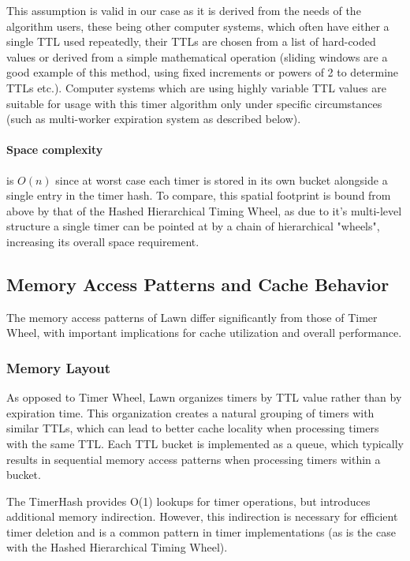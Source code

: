 \documentclass[conference]{IEEEtran}
\begin{document}
This assumption is valid in our case as it is derived from the needs of the algorithm users, these being other computer systems, which often have either a single TTL used repeatedly, their TTLs are chosen from a list of hard-coded values or derived from a simple mathematical operation (sliding windows are a good example of this method, using fixed increments or powers of 2 to determine TTLs etc.). Computer systems which are using highly variable TTL values are suitable for usage with this timer algorithm only under specific circumstances (such as multi-worker expiration system as described below).

\paragraph{Space complexity} is $O(n)$ since at worst case each timer is stored in its own bucket alongside a single entry in the timer hash. To compare, this spatial footprint is bound from above by that of the Hashed Hierarchical Timing Wheel, as due to it's multi-level structure a single timer can be pointed at by a chain of hierarchical "wheels", increasing its overall space requirement.

\subsection{Memory Access Patterns and Cache Behavior}
The memory access patterns of Lawn differ significantly from those of Timer Wheel, with important implications for cache utilization and overall performance. 

\subsubsection{Memory Layout}
As opposed to Timer Wheel, Lawn organizes timers by TTL value rather than by expiration time. This organization creates a natural grouping of timers with similar TTLs, which can lead to better cache locality when processing timers with the same TTL. Each TTL bucket is implemented as a queue, which typically results in sequential memory access patterns when processing timers within a bucket.

The TimerHash provides O(1) lookups for timer operations, but introduces additional memory indirection. However, this indirection is necessary for efficient timer deletion and is a common pattern in timer implementations (as is the case with the Hashed Hierarchical Timing Wheel\cite{TW}).
\end{document}
